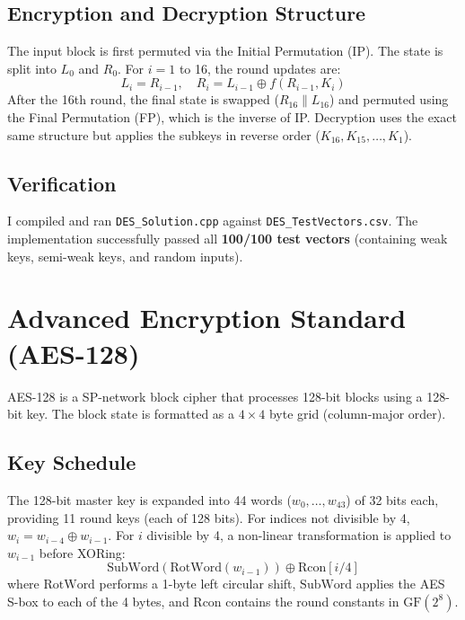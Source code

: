 \documentclass{article}
\begin{document}
\subsection{Encryption and Decryption Structure}
The input block is first permuted via the Initial Permutation (IP). The state is split into $L_0$ and $R_0$. For $i = 1$ to 16, the round updates are:
\[ L_i = R_{i-1}, \quad R_i = L_{i-1} \oplus f(R_{i-1}, K_i) \]
After the 16th round, the final state is swapped ($R_{16} \parallel L_{16}$) and permuted using the Final Permutation (FP), which is the inverse of IP. Decryption uses the exact same structure but applies the subkeys in reverse order ($K_{16}, K_{15}, \dots, K_1$).

\subsection{Verification}
I compiled and ran \texttt{DES\_Solution.cpp} against \texttt{DES\_TestVectors.csv}. The implementation successfully passed all \textbf{100/100 test vectors} (containing weak keys, semi-weak keys, and random inputs).

\section{Advanced Encryption Standard (AES-128)}

AES-128 is a SP-network block cipher that processes 128-bit blocks using a 128-bit key. The block state is formatted as a $4 \times 4$ byte grid (column-major order).

\subsection{Key Schedule}
The 128-bit master key is expanded into 44 words ($w_0, \dots, w_{43}$) of 32 bits each, providing 11 round keys (each of 128 bits). For indices not divisible by 4, $w_i = w_{i-4} \oplus w_{i-1}$. For $i$ divisible by 4, a non-linear transformation is applied to $w_{i-1}$ before XORing:
\[ \text{SubWord}(\text{RotWord}(w_{i-1})) \oplus \text{Rcon}[i/4] \]
where $\text{RotWord}$ performs a 1-byte left circular shift, $\text{SubWord}$ applies the AES S-box to each of the 4 bytes, and $\text{Rcon}$ contains the round constants in $\text{GF}(2^8)$.
\end{document}
